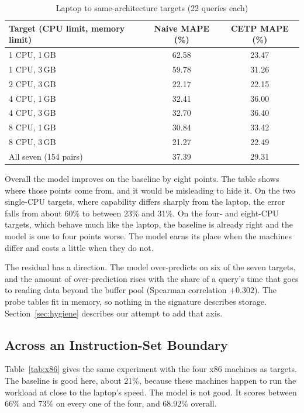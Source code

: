 \documentclass[runningheads]{llncs}
\begin{document}
\begin{table}[t]
\centering
\caption{Laptop to same-architecture targets (22 queries each)}
\label{tab:same}
\begin{tabular}{lcc}
\toprule
Target (CPU limit, memory limit) & Naive MAPE (\%) & CETP MAPE (\%) \\
\midrule
1 CPU, 1\,GB & 62.58 & 23.47 \\
1 CPU, 3\,GB & 59.78 & 31.26 \\
2 CPU, 3\,GB & 22.17 & 22.15 \\
4 CPU, 1\,GB & 32.41 & 36.00 \\
4 CPU, 3\,GB & 32.70 & 36.40 \\
8 CPU, 1\,GB & 30.84 & 33.42 \\
8 CPU, 3\,GB & 21.27 & 22.49 \\
\midrule
All seven (154 pairs) & 37.39 & 29.31 \\
\bottomrule
\end{tabular}
\end{table}

Overall the model improves on the baseline by eight points. The table shows
where those points come from, and it would be misleading to hide it. On the
two single-CPU targets, where capability differs sharply from the laptop, the
error falls from about 60\% to between 23\% and 31\%. On the four- and
eight-CPU targets, which behave much like the laptop, the baseline is already
right and the model is one to four points worse. The model earns its place
when the machines differ and costs a little when they do not.

The residual has a direction. The model over-predicts on six of the seven
targets, and the amount of over-prediction rises with the share of a query's
time that goes to reading data beyond the buffer pool (Spearman correlation
$+0.302$). The probe tables fit in memory, so nothing in the signature
describes storage. Section~\ref{sec:hygiene} describes our attempt to add
that axis.

\subsection{Across an Instruction-Set Boundary}
\label{sec:crossisa}

Table~\ref{tab:x86} gives the same experiment with the four x86 machines as
targets. The baseline is good here, about 21\%, because these machines happen
to run the workload at close to the laptop's speed. The model is not good. It
scores between 66\% and 73\% on every one of the four, and 68.92\% overall.
\end{document}

